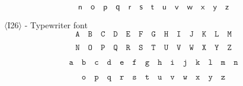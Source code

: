 \documentclass{book}
\begin{document}
\[\mathit{\mathbf{\mathsf{n}}}\quad \mathit{\mathbf{\mathsf{o}}}\quad \mathit{\mathbf{\mathsf{p}}}\quad
	\mathit{\mathbf{\mathsf{q}}}\quad \mathit{\mathbf{\mathsf{r}}}\quad \mathit{\mathbf{\mathsf{s}}}\quad
	\mathit{\mathbf{\mathsf{t}}}\quad \mathit{\mathbf{\mathsf{u}}}\quad \mathit{\mathbf{\mathsf{v}}}\quad
	\mathit{\mathbf{\mathsf{w}}}\quad \mathit{\mathbf{\mathsf{x}}}\quad \mathit{\mathbf{\mathsf{y}}}\quad
	\mathit{\mathbf{\mathsf{z}}}\]

$\langle$I26$\rangle$  - Typewriter font
\[\mathtt{A}\quad \mathtt{B}\quad \mathtt{C}\quad \mathtt{D}\quad
	\mathtt{E}\quad \mathtt{F}\quad \mathtt{G}\quad \mathtt{H}\quad
	\mathtt{I}\quad \mathtt{J}\quad \mathtt{K}\quad \mathtt{L}\quad
	\mathtt{M}\]

\[\mathtt{N}\quad \mathtt{O}\quad \mathtt{P}\quad
	\mathtt{Q}\quad \mathtt{R}\quad \mathtt{S}\quad \mathtt{T}\quad
	\mathtt{U}\quad \mathtt{V}\quad \mathtt{W}\quad \mathtt{X}\quad
	\mathtt{Y}\quad \mathtt{Z}\]

\[\mathtt{a}\quad \mathtt{b}\quad
	\mathtt{c}\quad \mathtt{d}\quad \mathtt{e}\quad \mathtt{f}\quad
	\mathtt{g}\quad \mathtt{h}\quad \mathtt{i}\quad \mathtt{j}\quad
	\mathtt{k}\quad \mathtt{l}\quad \mathtt{m}\quad \mathtt{n}\]

\[\mathtt{o}\quad \mathtt{p}\quad \mathtt{q}\quad \mathtt{r}\quad
	\mathtt{s}\quad \mathtt{t}\quad \mathtt{u}\quad \mathtt{v}\quad
	\mathtt{w}\quad \mathtt{x}\quad \mathtt{y}\quad \mathtt{z}\]
\end{document}
